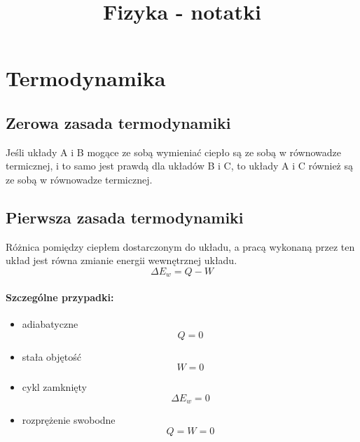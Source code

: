 \documentclass{article}
\title{Fizyka - notatki}
\begin{document}
    \maketitle
    \section{Termodynamika}
        \subsection{Zerowa zasada termodynamiki}
        Jeśli układy A i B mogące ze sobą wymieniać ciepło są ze sobą w równowadze 
        termicznej, i to samo jest prawdą dla układów B i C, to układy A i C również 
        są ze sobą w równowadze termicznej.
        \subsection{Pierwsza zasada termodynamiki}
            Różnica pomiędzy ciepłem dostarczonym do układu, a pracą wykonaną przez ten 
            układ jest równa zmianie energii wewnętrznej układu.
            \begin{equation}
                \Delta E_w = Q - W
            \end{equation}
            \paragraph{Szczególne przypadki:}
                \begin{itemize}
                    \item adiabatyczne
                    \begin{equation}
                        Q = 0
                    \end{equation}
                    \item stała objętość
                    \begin{equation}
                        W = 0
                    \end{equation}
                    \item cykl zamknięty
                    \begin{equation}
                        \Delta E_w = 0
                    \end{equation}
                    \item rozprężenie swobodne
                    \begin{equation}
                        Q = W = 0
                    \end{equation}
                \end{itemize}
        \newpage
\end{document}

